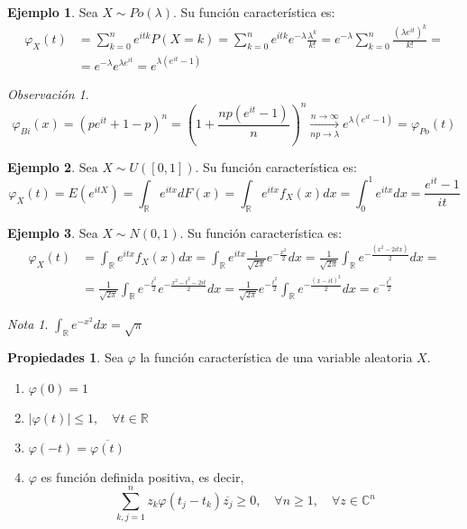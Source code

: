\documentclass{report}
\theoremstyle{remark}
\newtheorem*{remark}{Observación}
\theoremstyle{remark}
\newtheorem*{note}{Nota}
\theoremstyle{remark}
\theoremstyle{definition}
\theoremstyle{definition}
\newtheorem*{properties}{Propiedades}
\theoremstyle{definition}
\newtheorem*{example}{Ejemplo}
\theoremstyle{definition}
\begin{document}
\begin{example}
    Sea $X \sim Po(\lambda)$.
    Su función característica es:
    \begin{align*}
        \varphi_X(t) & = \sum_{k=0}^n e^{itk} P(X=k) = \sum_{k=0}^n e^{itk}e^{-\lambda}\frac{\lambda^k}{k!} = e^{-\lambda} \sum_{k=0}^n \frac{(\lambda e^{it})^k}{k!} = \\
                     & = e^{-\lambda}e^{\lambda e^{it}} = e^{\lambda(e^{it} - 1)}
    \end{align*}
\end{example}

\begin{remark}
    $$\varphi_{Bi}(x) = (pe^{it} + 1 - p)^n = \left( 1 + \frac{np(e^{it}-1)}{n} \right)^n \xrightarrow[np \to \lambda]{n \to \infty} e^{\lambda(e^{it} - 1)} = \varphi_{Po}(t)$$
\end{remark}

\begin{example}
    Sea $X \sim U([0, 1])$.
    Su función característica es:
    $$\varphi_X(t) = E(e^{itX}) = \int_\mathbb{R} e^{itx}dF(x) = \int_\mathbb{R} e^{itx}f_X(x)dx = \int_0^1 e^{itx}dx = \frac{e^{it}-1}{it}$$
\end{example}

\begin{example}
    Sea $X \sim N(0, 1)$.
    Su función característica es:
    \begin{align*}
        \varphi_X(t) & = \int_\mathbb{R} e^{itx}f_X(x)dx = \int_\mathbb{R} e^{itx} \frac{1}{\sqrt{2\pi}}e^{-\frac{x^2}{2}}dx = \frac{1}{\sqrt{2\pi}} \int_\mathbb{R} e^{-\frac{(x^2-2itx)}{2}}dx =                     \\
                     & = \frac{1}{\sqrt{2\pi}} \int_\mathbb{R} e^{-\frac{t^2}{2}}e^{-\frac{x^2-t^2-2it}{2}}dx = \frac{1}{\sqrt{2\pi}}e^{-\frac{t^2}{2}} \int_\mathbb{R} e^{-\frac{(x-it)^2}{2}}dx = e^{-\frac{t^2}{2}}
    \end{align*}

    \begin{note}
        $\int_\mathbb{R} e^{-x^2}dx = \sqrt{\pi}$
    \end{note}
\end{example}

\begin{properties}
    Sea $\varphi$ la función característica de una variable aleatoria $X$.
    \begin{enumerate}
        \item $\varphi(0) = 1$
        \item $|\varphi(t)| \leq 1, \quad \forall t \in \mathbb{R}$
        \item $\varphi(-t) = \overline{\varphi(t)}$
        \item $\varphi$ es función definida positiva, es decir,
              $$\sum_{k,j=1}^n z_k\varphi(t_j-t_k)\overline{z_j} \geq 0, \quad \forall n \geq 1, \quad \forall z \in \mathbb{C}^n$$
    \end{enumerate}
\end{properties}
\end{document}
